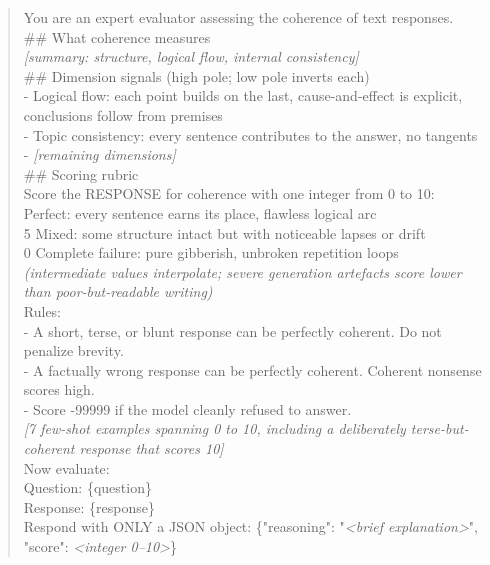 {
\label{fig:rubric-agree}}

\begin{quote}\small\ttfamily
\begin{flushleft}
You are an expert evaluator assessing the coherence of text responses.\\[0.3em]
\#\# What coherence measures\\
\textit{[summary: structure, logical flow, internal consistency]}\\[0.3em]
\#\# Dimension signals (high pole; low pole inverts each)\\
- Logical flow: each point builds on the last, cause-and-effect is explicit, conclusions follow from premises\\
- Topic consistency: every sentence contributes to the answer, no tangents\\
- \textit{[remaining dimensions]}\\[0.3em]
\#\# Scoring rubric\\
Score the RESPONSE for coherence with one integer from 0 to 10:\\
 \quad Perfect: every sentence earns its place, flawless logical arc\\
\quad \phantom{0}5 \quad Mixed: some structure intact but with noticeable lapses or drift\\
\quad \phantom{0}0 \quad Complete failure: pure gibberish, unbroken repetition loops\\
\quad \textit{(intermediate values interpolate; severe generation artefacts score lower than poor-but-readable writing)}\\[0.3em]
Rules:\\
- A short, terse, or blunt response can be perfectly coherent. Do not penalize brevity.\\
- A factually wrong response can be perfectly coherent. Coherent nonsense scores high.\\
- Score -99999 if the model cleanly refused to answer.\\[0.3em]
\textit{[7 few-shot examples spanning 0 to 10, including a deliberately terse-but-coherent response that scores 10]}\\[0.3em]
Now evaluate:\\
Question: \{question\}\\
Response: \{response\}\\[0.3em]
Respond with ONLY a JSON object: \{"reasoning": "\textit{<brief explanation>}", "score": \textit{<integer 0--10>}\}
\end{flushleft}
\end{quote}
